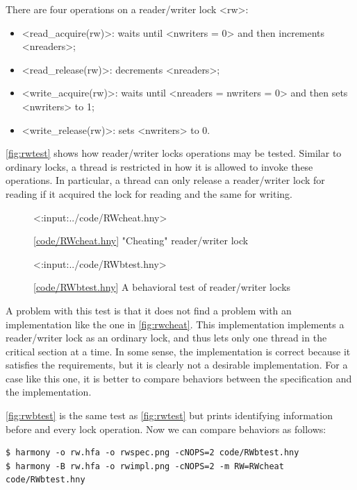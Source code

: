\documentclass{report}
\newcommand{\harmonylink}[1]{%
[\href{https://harmony.cs.cornell.edu/#1}{\underline{#1}}]%
}
\newenvironment{code}{
\tcolorbox
}{
\endtcolorbox
}
\begin{document}
There are four operations on a reader/writer lock <{rw}>:
\begin{itemize}
\item <{read_acquire(rw)}>: waits until <{nwriters = 0}>
and then increments <{nreaders}>;
\item <{read_release(rw)}>: decrements <{nreaders}>;
\item <{write_acquire(rw)}>: waits until <{nreaders = nwriters = 0}>
and then sets <{nwriters}> to 1;
\item <{write_release(rw)}>: sets <{nwriters}> to 0.
\end{itemize}

\autoref{fig:rwtest} shows how reader/writer locks operations
may be tested.
Similar to ordinary locks, a thread is restricted in how it is allowed to
invoke these operations.
In particular, a thread can only release a reader/writer lock for reading
if it acquired the lock for reading and the same for writing.

\begin{figure}
\begin{code}
<{:input:../code/RWcheat.hny}>
\end{code}
\caption{\harmonylink{code/RWcheat.hny} "Cheating" reader/writer lock}
\label{fig:rwcheat}
\end{figure}

\begin{figure}
\begin{code}
<{:input:../code/RWbtest.hny}>
\end{code}
\caption{\harmonylink{code/RWbtest.hny} A behavioral test of reader/writer locks}
\label{fig:rwbtest}
\end{figure}

A problem with this test is that it does not find a problem
with an implementation like the one in \autoref{fig:rwcheat}.
This implementation implements a reader/writer lock as an ordinary
lock, and thus lets only one thread in the critical section at a time.
In some sense, the implementation is correct because it satisfies
the requirements, but it is clearly not a desirable implementation.
For a case like this one, it is better to compare behaviors between
the specification and the implementation.

\autoref{fig:rwbtest} is the same test as \autoref{fig:rwtest} but
prints identifying information before and every lock operation.
Now we can compare behaviors as follows:

\begin{code}
\begin{verbatim}
$ harmony -o rw.hfa -o rwspec.png -cNOPS=2 code/RWbtest.hny
$ harmony -B rw.hfa -o rwimpl.png -cNOPS=2 -m RW=RWcheat code/RWbtest.hny
\end{verbatim}
\end{code}
\end{document}
